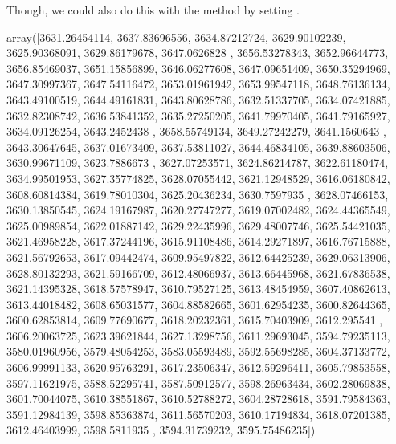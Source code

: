 \documentclass[letterpaper,10pt,english]{sphinxmanual}
\begin{document}
Though, we could also do this with the  method by setting .

\begin{sphinxVerbatim}[commandchars=\\\{\}]
\end{sphinxVerbatim}

\begin{sphinxVerbatim}[commandchars=\\\{\}]
array([3631.26454114, 3637.83696556, 3634.87212724, 3629.90102239,
       3625.90368091, 3629.86179678, 3647.0626828 , 3656.53278343,
       3652.96644773, 3656.85469037, 3651.15856899, 3646.06277608,
       3647.09651409, 3650.35294969, 3647.30997367, 3647.54116472,
       3653.01961942, 3653.99547118, 3648.76136134, 3643.49100519,
       3644.49161831, 3643.80628786, 3632.51337705, 3634.07421885,
       3632.82308742, 3636.53841352, 3635.27250205, 3641.79970405,
       3641.79165927, 3634.09126254, 3643.2452438 , 3658.55749134,
       3649.27242279, 3641.1560643 , 3643.30647645, 3637.01673409,
       3637.53811027, 3644.46834105, 3639.88603506, 3630.99671109,
       3623.7886673 , 3627.07253571, 3624.86214787, 3622.61180474,
       3634.99501953, 3627.35774825, 3628.07055442, 3621.12948529,
       3616.06180842, 3608.60814384, 3619.78010304, 3625.20436234,
       3630.7597935 , 3628.07466153, 3630.13850545, 3624.19167987,
       3620.27747277, 3619.07002482, 3624.44365549, 3625.00989854,
       3622.01887142, 3629.22435996, 3629.48007746, 3625.54421035,
       3621.46958228, 3617.37244196, 3615.91108486, 3614.29271897,
       3616.76715888, 3621.56792653, 3617.09442474, 3609.95497822,
       3612.64425239, 3629.06313906, 3628.80132293, 3621.59166709,
       3612.48066937, 3613.66445968, 3621.67836538, 3621.14395328,
       3618.57578947, 3610.79527125, 3613.48454959, 3607.40862613,
       3613.44018482, 3608.65031577, 3604.88582665, 3601.62954235,
       3600.82644365, 3600.62853814, 3609.77690677, 3618.20232361,
       3615.70403909, 3612.295541  , 3606.20063725, 3623.39621844,
       3627.13298756, 3611.29693045, 3594.79235113, 3580.01960956,
       3579.48054253, 3583.05593489, 3592.55698285, 3604.37133772,
       3606.99991133, 3620.95763291, 3617.23506347, 3612.59296411,
       3605.79853558, 3597.11621975, 3588.52295741, 3587.50912577,
       3598.26963434, 3602.28069838, 3601.70044075, 3610.38551867,
       3610.52788272, 3604.28728618, 3591.79584363, 3591.12984139,
       3598.85363874, 3611.56570203, 3610.17194834, 3618.07201385,
       3612.46403999, 3598.5811935 , 3594.31739232, 3595.75486235])
\end{sphinxVerbatim}
\end{document}
